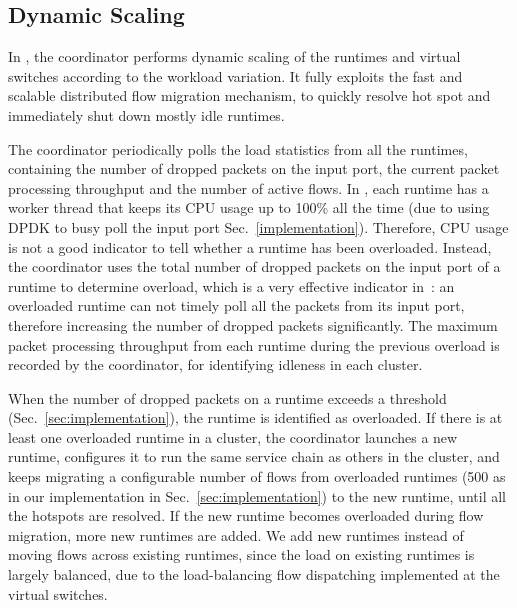 \subsection{Dynamic Scaling}
\label{sec:scaling}

In \nfactor, the coordinator performs dynamic scaling of the runtimes and virtual switches according to the workload variation. It fully exploits the fast and scalable distributed flow migration mechanism, to quickly resolve hot spot and immediately shut down mostly idle runtimes.

The coordinator periodically polls the load statistics from all the runtimes, containing the number of dropped packets on the input port, the current packet processing throughput and the number of active flows.
In \nfactor, each runtime has a worker thread that keeps its CPU usage up to 100\% all the time (due to using DPDK to busy poll the input port Sec.~\ref{implementation}). Therefore, CPU usage is not a good indicator to tell whether a runtime has been overloaded. Instead, the coordinator uses the total number of dropped packets on the input port of a runtime to determine overload, which is a very effective indicator in~\nfactor: an overloaded runtime can not timely poll all the packets from its input port, therefore increasing the number of dropped packets significantly. The maximum packet processing throughput from each runtime during the previous overload  is recorded by the coordinator, for identifying idleness in each cluster. %

When the number of dropped packets on a runtime exceeds a threshold (Sec.~\ref{sec:implementation}), the runtime is identified as overloaded. If there is at least one overloaded runtime in a cluster, the coordinator launches a new runtime, configures it to run the same service chain as others in the cluster, and keeps migrating a configurable number of flows from overloaded runtimes (500 as in our implementation in Sec.~\ref{sec:implementation}) to the new runtime, until all the hotspots are resolved. If the new runtime becomes overloaded during flow migration, more new runtimes are added. We add new runtimes instead of moving flows across existing runtimes, since the load on existing runtimes is largely balanced, due to the load-balancing flow dispatching implemented at the virtual switches.

